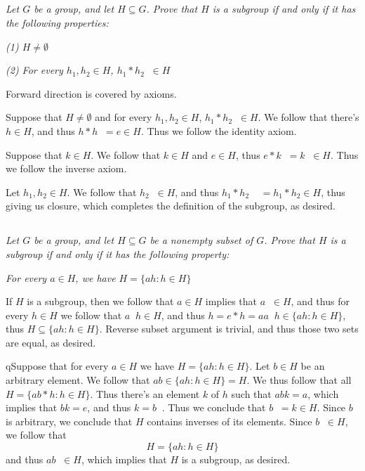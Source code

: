 \documentclass[11pt,oneside,titlepage]{book}
\DeclareMathOperator \inv {^{-1}}
\newcommand{\set}[1]{\{ #1 \}}
\begin{document}
\subsection{}

\textit{Let $G$ be a group, and let $H \subseteq G$. Prove that $H$ is
a subgroup if and only if it has the following properties:}

\textit{(1) $H \neq \emptyset$}

\textit{(2) For every $h_1, h_2 \in H$, $h_1 * h_2 \inv \in H$}

Forward direction is covered by axioms.

Suppose that $H \neq \emptyset$ and for every $h_1, h_2 \in H$, $h_1 *
h_2 \inv \in H$. We follow that there's $h \in H$, and thus $h * h\inv
= e \in H$. Thus we follow the identity axiom.

Suppose that $k \in H$. We follow that $k \in H$ and $e \in H$, thus
$e * k\inv = k\inv \in H$. Thus we follow the inverse axiom.

Let $h_1, h_2 \in H$. We follow that $h_2 \inv \in H$, and thus $h_1 *
h_2 \inv \inv = h_1 * h_2 \in H$, thus giving us closure, which
completes the definition of the subgroup, as desired.

\subsection{}

\textit{Let $G$ be a group, and let $H \subseteq G$ be a nonempty
subset of $G$. Prove that $H$ is a subgroup if and only if it has the
following property:}

\textit{For every $a \in H$, we have $H = \set{ah: h \in H}$}

If $H$ is a subgroup, then we follow that $a \in H$ implies that
$a\inv \in H$, and thus for every $h \in H$ we follow that $a \inv h
\in H$, and thus $h = e * h = a a\inv h \in \set{ah: h \in H}$, thus
$H \subseteq \set{ah: h \in H}$. Reverse subset argument is trivial,
and thus those two sets are equal, as desired.

qSuppose that for every $a \in H$ we have $H = \set{ah: h \in H}$.
Let $b \in H$ be an arbitrary element. We follow that $a b \in
\set{ah: h \in H} = H$.  We thus follow that all $H = \set{ab * h: h
\in H}$. Thus there's an element $k$ of $h$ such that $abk = a$, which
implies that $bk = e$, and thus $k = b\inv$. Thus we conclude that
$b\inv = k \in H$. Since $b$ is arbitrary, we conclude that $H$
contains inverses of its elements. Since $b\inv \in H$, we follow that
$$H = \set{a h: h \in H}$$
and thus $a b\inv \in H$, which implies that $H$ is a subgroup, as
desired.
\end{document}
